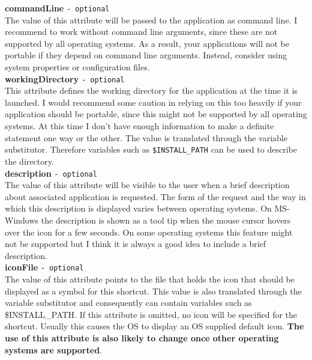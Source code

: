 \textbf{commandLine} \texttt{- optional}\\

The value of this attribute will be passed to the application as command
line. I recommend to work without command line arguments, since these are
not supported by all operating systems. As a result, your applications
will not be portable if they depend on command line arguments. Instead,
consider using system properties or configuration files.\\

\textbf{workingDirectory} \texttt{- optional}\\

This attribute defines the working directory for the application at the
time it is launched. I would recommend some caution in relying on this
too heavily if your application should be portable, since this might not
be supported by all operating systems. At this time I don't have enough
information to make a definite statement one way or the other. The value
is translated through the variable substitutor. Therefore variables such
as \texttt{\$INSTALL\_PATH} can be used to describe the directory.\\

\textbf{description} \texttt{- optional}\\

The value of this attribute will be visible to the user when a brief
description about associated application is requested. The form of the
request and the way in which this description is displayed varies
between operating systems. On MS-Windows the description is shown as a
tool tip when the mouse cursor hovers over the icon for a few seconds.
On some operating systems this feature might not be supported but I
think it is always a good idea to include a brief description.\\

\textbf{iconFile} \texttt{- optional}\\

The value of this attribute points to the file that holds the icon that
should be displayed as a symbol for this shortcut. This value is also
translated through the variable substitutor and consequently can contain
variables such as \$INSTALL\_PATH. If this attribute is omitted, no icon
will be specified for the shortcut. Usually this causes the OS to
display an OS supplied default icon. \textbf{The use of this attribute
is also likely to change once other operating systems are supported}.\\

